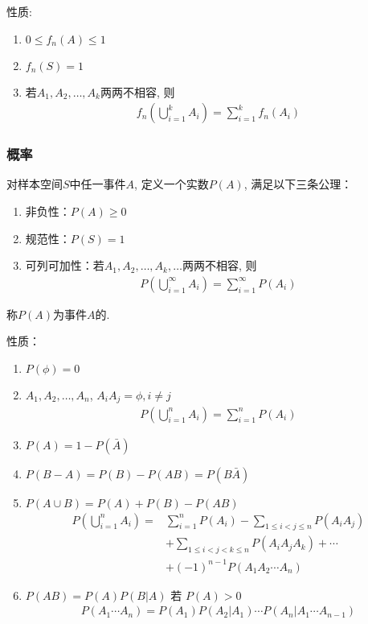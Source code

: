性质: 
\begin{enumerate}
    \item $0\le f_n(A) \le 1$
    \item $f_n(S)=1$
    \item 若$A_1,A_2,\dots,A_k$两两不相容, 则
    \begin{align*}
        f_n\left(\bigcup_{i=1}^k A_i\right)=\sum_{i=1}^k f_n(A_i)
    \end{align*}
\end{enumerate}

\subsubsection{概率}
\begin{definition}
    对样本空间$S$中任一事件$A$, 定义一个实数$P(A)$, 满足以下三条公理：
    \begin{enumerate}
        \item 非负性：$P(A)\ge 0$
        \item 规范性：$P(S)=1$
        \item 可列可加性：若$A_1,A_2,\dots,A_k,\dots$两两不相容, 则
        \begin{align*}
            P\left(\bigcup_{i=1}^{\infty}A_i\right)=\sum_{i=1}^{\infty}P(A_i)
        \end{align*}
    \end{enumerate}
称$P(A)$为事件$A$的. 
\end{definition}

性质：
\begin{enumerate}
    \item $P(\phi)=0$
    \item $A_1,A_2,\dots,A_n$, $A_i A_j=\phi, i\ne j$
    \begin{align*}
        P\left(\bigcup_{i=1}^{n}A_i\right)=\sum_{i=1}^{n}P(A_i)
    \end{align*}
    \item $P(A)=1-P(\bar{A})$
    \item $P(B-A)=P(B)-P(AB)=P(B\bar{A})$
    \item $P(A\cup B)=P(A)+P(B)-P(AB)$
    \begin{align*}
        P\left(\bigcup_{i=1}^n A_i\right)=&\sum_{i=1}^n P(A_i)-\sum_{1\le i<j\le n}P(A_i A_j)\\
        &+\sum_{1\le i<j<k\le n}P(A_i A_j A_k)+\cdots\\
        &+(-1)^{n-1}P(A_1 A_2 \cdots A_n)
    \end{align*}
    \item $P(AB)=P(A)P(B|A)$ 若 $P(A)>0$
    \begin{align*}
        P(A_1\cdots A_n)=P(A_1)P(A_2|A_1)\cdots P(A_n|A_1\cdots A_{n-1})
    \end{align*}
\end{enumerate}

